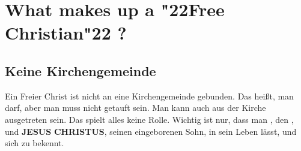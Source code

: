 \documentclass[12pt,a4paper]{article}
\newcommand{\Christus}[0]{\textbf{CHRISTUS}}
\newcommand{\Jesus}[0]{\textbf{JESUS}}
\newcommand{\q}[1]{\char"22{#1}\char"22 }
\begin{document}
	
	\section{What makes up a \q{Free Christian}?}
	
	\subsection{Keine Kirchengemeinde}
		Ein Freier Christ ist nicht an eine Kirchengemeinde gebunden.
		Das hei{\ss}t,
		man darf,
		aber man muss nicht getauft sein.
		Man kann auch aus der Kirche ausgetreten sein.
		Das spielt alles keine Rolle.
		Wichtig ist nur,
		dass man {\Gott},
		den {\Herrn},
		und {\Jesus} {\Christus},
		seinen eingeborenen Sohn,
		in sein Leben l\"asst,
		und sich zu {\Ihnen} bekennt.
	
\end{document}
